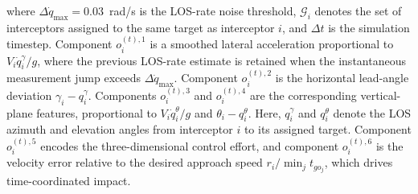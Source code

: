 \documentclass[lettersize,journal]{IEEEtran}
\newcommand{\hladd}[1]{{\color{blue}#1}}
\begin{document}
where $\Delta\dot{q}_{\max}=0.03$~rad/s is the LOS-rate noise threshold, $\mathcal{G}_i$ denotes the set of interceptors assigned to the same target as interceptor $i$, and $\Delta t$ is the simulation timestep. 
\hladd{Component $o_i^{(t),1}$ is a smoothed lateral acceleration proportional to $V_i\dot q_i^{\gamma}/g$, where the previous LOS-rate estimate is retained when the instantaneous measurement jump exceeds $\Delta\dot q_{\max}$.
Component $o_i^{(t),2}$ is the horizontal lead-angle deviation $\gamma_i-q_i^{\gamma}$.
Components $o_i^{(t),3}$ and $o_i^{(t),4}$ are the corresponding vertical-plane features, proportional to $V_i\dot q_i^{\theta}/g$ and $\theta_i-q_i^{\theta}$. Here, $q_i^{\gamma}$ and $q_i^{\theta}$ denote the LOS azimuth and elevation angles from interceptor $i$ to its assigned target.
Component $o_i^{(t),5}$ encodes the three-dimensional control effort, and component $o_i^{(t),6}$ is the velocity error relative to the desired approach speed $r_i/\min_j t_{go_j}$, which drives time-coordinated impact.}
\end{document}
